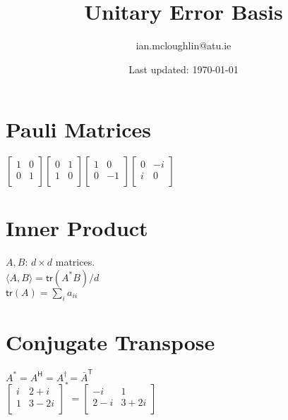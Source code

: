\documentclass{iansnotes}
\title{Unitary Error Basis}
\author{ian.mcloughlin@atu.ie}
\date{Last updated: \today}
\begin{document}
 
\maketitle

\section{Pauli Matrices}

$\begin{bmatrix}
  1 & 0 \\
  0 & 1 \\
\end{bmatrix}
\begin{bmatrix}
  0 & 1 \\
  1 & 0 \\
\end{bmatrix}
\begin{bmatrix}
  1 & 0 \\
  0 & -1 \\
\end{bmatrix}
\begin{bmatrix}
  0 & -i \\
  i & 0 \\
\end{bmatrix}$

\section{Inner Product}

$A, B$: $d \times d$ matrices.\\[2mm]
$\langle A, B \rangle = \textsf{tr}(A^* B) / d$\\[2mm]
$\textsf{tr}(A) = \sum_i a_{ii}$

\section{Conjugate Transpose}

$A^* = A^\textsf{H} = A^\dagger = \bar{A}^\textsf{T}$\\[4mm]
$\begin{bmatrix}
  i & 2+i \\
  1 & 3-2i \\
\end{bmatrix}^* = 
\begin{bmatrix}
  -i & 1 \\
  2-i & 3+2i \\
\end{bmatrix}$
\end{document}
